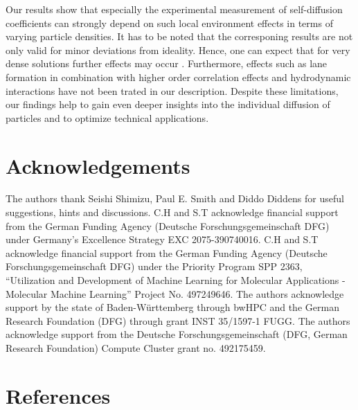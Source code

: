 \documentclass[aip,jcp,reprint]{revtex4-1}
\begin{document}
Our results show that especially the experimental measurement of self-diffusion coefficients can strongly depend on such local environment effects in terms of varying particle densities. It has to be noted that the corresponing results are not only valid for minor deviations from ideality. Hence, one can expect that for very dense solutions further effects may occur \cite{rex08a}. Furthermore, effects such as lane formation in combination with higher order correlation effects and hydrodynamic interactions have not been trated in our description. Despite these limitations, our findings help to gain even deeper insights into the individual diffusion of particles and to optimize technical applications.

\section{Acknowledgements}
The authors thank Seishi Shimizu, Paul E. Smith and Diddo Diddens for useful suggestions, hints and discussions.
C.H and S.T acknowledge financial support from the German Funding Agency (Deutsche Forschungsgemeinschaft DFG) under Germany’s Excellence Strategy EXC 2075-390740016.
C.H and S.T acknowledge financial support from the German Funding Agency (Deutsche Forschungsgemeinschaft DFG) under the Priority Program SPP 2363, “Utilization and Development of Machine Learning for Molecular Applications - Molecular Machine Learning” Project No. 497249646.
The authors acknowledge support by the state of Baden-Württemberg through bwHPC and the German Research Foundation (DFG) through grant INST 35/1597-1 FUGG.
The authors acknowledge support from the Deutsche Forschungsgemeinschaft (DFG, German Research Foundation) Compute Cluster grant no. 492175459.

\section*{References}


\end{document}
